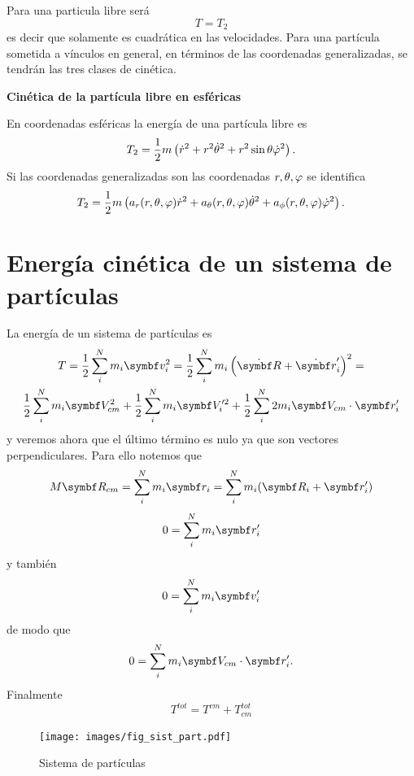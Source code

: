 \documentclass[10pt,oneside]{CBFT_book}
\begin{document}
Para una particula libre será
\[
	T = T_2
\]
es decir que solamente es cuadrática en las velocidades. Para una partícula sometida a vínculos en general, en términos
de las coordenadas generalizadas, se tendrán las tres clases de cinética.

\begin{ejemplo}{\bf Cinética de la partícula libre en esféricas}

En coordenadas esféricas la energía de una partícula libre es 
\[
	T_2 =  \frac{1}{2} m \left( \dot{r}^2 + r^2 \dot{\theta}^2 + r^2 \sin \theta \dot{\varphi}^2 \right).
\]
Si las coordenadas generalizadas son las coordenadas $ r, \theta, \varphi $ se identifica 
\[
	T_2 =  \frac{1}{2} m \left( a_r(r, \theta, \varphi ) \dot{r}^2 + a_\theta(r, \theta, \varphi ) \dot{\theta}^2 + 
	a_\phi(r, \theta, \varphi ) \dot{\varphi}^2 \right).
\]
\end{ejemplo}

\section{Energía cinética de un sistema de partículas}

La energía de un sistema de partículas es 
\begin{multline*}
	T = \frac{1}{2} \sum_i^N m_i \vb{v}_i^2 = 
	\frac{1}{2} \sum_i^N m_i \left( \dot{\vb{R}} + \dot{\vb{r}}_i' \right)^2 = \\
	\frac{1}{2} \sum_i^N m_i \vb{V}_{cm}^2  +
	\frac{1}{2} \sum_i^N m_i \vb{V}_i'^2 +
	\frac{1}{2} \sum_i^N 2 m_i \vb{V}_{cm} \cdot  \vb{r}_{i}' 
\end{multline*}
y veremos ahora que el último término es nulo ya que son vectores perpendiculares.
Para ello notemos que 
\[
	M \vb{R}_{cm} = \sum_i^N m_i \vb{r}_i = \sum_i^N m_i ( \vb{R}_i + \vb{r}_i' )
\]
\[
	0 = \sum_i^N m_i \vb{r}_i'
\]
y también 
\[
	0 = \sum_i^N m_i \vb{v}_i'
\]
de modo que 
\[
	0 = \sum_i^N m_i \vb{V}_{cm} \cdot \vb{r}_i'.
\]
Finalmente 
\[
	T^{tot} = T^{cm} + T_{cm}^{tot}
\]

\begin{figure}
	\begin{center}
	\texttt{[image: images/fig\_sist\_part.pdf]}	 
	\end{center}
	\caption{Sistema de partículas}
\end{figure} 
\end{document}
